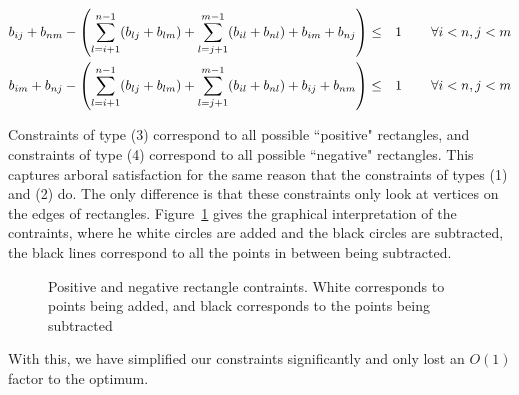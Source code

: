 \documentclass[11pt]{article}
\begin{document}
\begin{align}
b_{ij} + b_{nm} - \left(\sum_{l=i+1}^{n-1} (b_{lj}+b_{lm}) + \sum_{l=j+1}^{m-1} (b_{il} + b_{nl}) + b_{im} + b_{nj} \right) &\leq& 1 & \hspace{.3in} \forall i<n, j<m \\
b_{im} + b_{nj} - \left(\sum_{l=i+1}^{n-1} (b_{lj}+b_{lm}) + \sum_{l=j+1}^{m-1} (b_{il} + b_{nl}) + b_{ij} + b_{nm} \right) &\leq& 1 & \hspace{.3in} \forall i<n, j<m
\end{align}

Constraints of type (3) correspond to all possible ``positive" rectangles, and constraints of type (4) correspond to all possible ``negative" rectangles. This captures arboral satisfaction for the same reason that the constraints of types (1) and (2) do. The only difference is that these constraints only look at vertices on the edges of rectangles. Figure~\ref{fig:rectangles} gives the graphical interpretation of the contraints, where he white circles are added  and the black circles are subtracted, the black lines correspond to all the points in between being subtracted.

\begin{figure}
\centering
{}
\caption{Positive and negative rectangle contraints. White corresponds to points being added, and black corresponds to the points being subtracted}
\label{fig:rectangles}
\end{figure}

With this, we have simplified our constraints significantly and only lost an $O(1)$ factor to the optimum.
\end{document}
